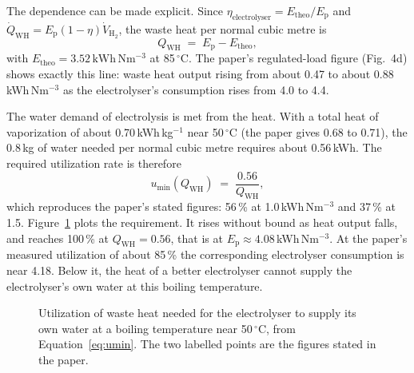 \documentclass[11pt]{article}
\theoremstyle{definition}
\theoremstyle{remark}
\newcommand{\Ep}{E_{\mathrm{p}}}
\newcommand{\Et}{E_{\mathrm{theo}}}
\newcommand{\QWH}{Q_{\mathrm{WH}}}
\begin{document}
The dependence can be made explicit. Since $\eta_{\mathrm{electrolyser}}=\Et/\Ep$ and $\dot Q_{\mathrm{WH}}=\Ep(1-\eta)\dot V_{\mathrm{H_2}}$, the waste heat per normal cubic metre is
\begin{equation}
  \QWH \;=\; \Ep-\Et,
  \label{eq:qwh}
\end{equation}
with $\Et=3.52\,\mathrm{kWh\,Nm^{-3}}$ at 85\,$^{\circ}$C. The paper's regulated-load figure (Fig.~4d) shows exactly this line: waste heat output rising from about 0.47 to about 0.88\,kWh\,Nm$^{-3}$ as the electrolyser's consumption rises from 4.0 to 4.4.

The water demand of electrolysis is met from the heat. With a total heat of vaporization of about 0.70\,kWh\,kg$^{-1}$ near 50\,$^{\circ}$C (the paper gives 0.68 to 0.71), the 0.8\,kg of water needed per normal cubic metre requires about 0.56\,kWh. The required utilization rate is therefore
\begin{equation}
  u_{\min}(\QWH)\;=\;\frac{0.56}{\QWH},
  \label{eq:umin}
\end{equation}
which reproduces the paper's stated figures: 56\,\% at 1.0\,kWh\,Nm$^{-3}$ and 37\,\% at 1.5. Figure~\ref{fig:umin} plots the requirement. It rises without bound as heat output falls, and reaches 100\,\% at $\QWH=0.56$, that is at $\Ep\approx4.08$\,kWh\,Nm$^{-3}$. At the paper's measured utilization of about 85\,\% the corresponding electrolyser consumption is near 4.18. Below it, the heat of a better electrolyser cannot supply the electrolyser's own water at this boiling temperature.

\begin{figure}[t]
\centering
{}
\caption{Utilization of waste heat needed for the electrolyser to supply its own water at a boiling temperature near 50\,$^{\circ}$C, from Equation~\eqref{eq:umin}. The two labelled points are the figures stated in the paper.}
\label{fig:umin}
\end{figure}
\end{document}
